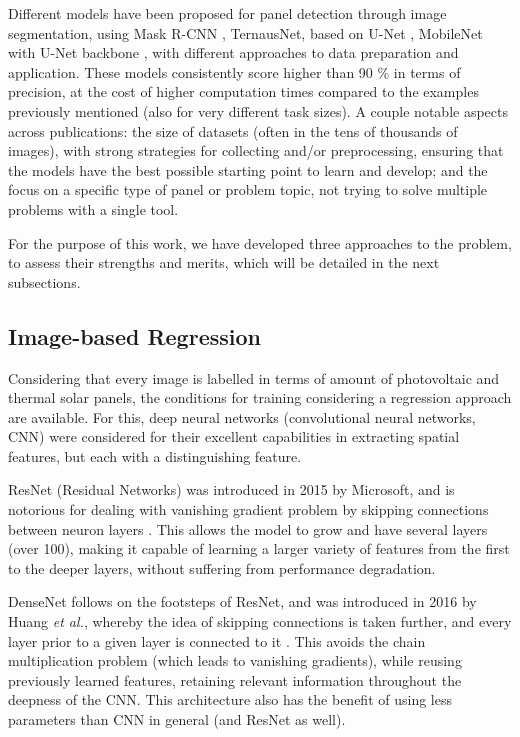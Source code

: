 \documentclass[conference]{IEEEtran}
\begin{document}
Different models have been proposed for panel detection through image segmentation, using Mask R-CNN \cite{maskrcnn} , TernausNet, based on U-Net \cite{KAUSIKA2021100111}, MobileNet with U-Net backbone \cite{wani2021segmentation}, with different approaches to data preparation and application. These models consistently score higher than 90 \% in terms of precision, at the cost of higher computation times compared to the examples previously mentioned (also for very different task sizes). A couple notable aspects across publications: the size of datasets (often in the tens of thousands of images), with strong strategies for collecting and/or preprocessing, ensuring that the models have the best possible starting point to learn and develop; and the focus on a specific type of panel or problem topic, not trying to solve multiple problems with a single tool.

For the purpose of this work, we have developed three approaches to the problem, to assess their strengths and merits, which will be detailed in the next subsections.

\subsection{Image-based Regression}

Considering that every image is labelled in terms of amount of photovoltaic and thermal solar panels, the conditions for training considering a regression approach are available. For this, deep neural networks (convolutional neural networks, CNN) were considered for their excellent capabilities in extracting spatial features, but each with a distinguishing feature.

ResNet (Residual Networks) was introduced in 2015 by Microsoft, and is notorious for dealing with vanishing gradient problem by skipping connections between neuron layers \cite{ResNet}. This allows the model to grow and have several layers (over 100), making it capable of learning a larger variety of features from the first to the deeper layers, without suffering from performance degradation.

DenseNet follows on the footsteps of ResNet, and was introduced in 2016 by Huang \textit{et al.}, whereby the idea of skipping connections is taken further, and every layer prior to a given layer is connected to it \cite{DenseNet}. This avoids the chain multiplication problem (which leads to vanishing gradients), while reusing previously learned features, retaining relevant information throughout the deepness of the CNN. This architecture also has the benefit of using less parameters than CNN in general (and ResNet as well).
\end{document}

